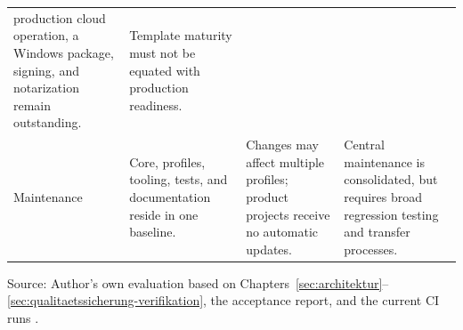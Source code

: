 \begin{table}[htbp]
\begin{tabularx}{\textwidth}{@{}>{\raggedright\arraybackslash}p{}>{\raggedright\arraybackslash}p{}>{\raggedright\arraybackslash}p{}>{\raggedright\arraybackslash}X@{}}
      production cloud operation, a Windows package, signing, and notarization
      remain outstanding. & Template maturity must not be equated with production
      readiness. \\
    Maintenance & Core, profiles, tooling, tests, and documentation reside in one
      baseline. & Changes may affect multiple profiles; product projects
      receive no automatic updates. & Central maintenance is consolidated,
      but requires broad regression testing and transfer processes. \\
    \bottomrule
  \end{tabularx}
  \smallskip
  {\footnotesize Source: Author's own evaluation based on
  Chapters~\ref{sec:architektur}--\ref{sec:qualitaetssicherung-verifikation},
  the acceptance report, and the current CI runs
  \parencite{kleiveist2026acceptance,kleiveist2026ci-core-run,kleiveist2026ci-profiles-run,kleiveist2026ci-postgres-run,kleiveist2026ci-desktop-run,kleiveist2026quality-implementation,kleiveist2026governance-core-run,kleiveist2026governance-profiles-run}.\par}
\end{table}
